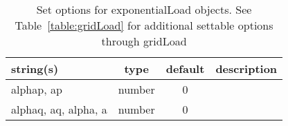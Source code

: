 \begin{table}[ht]
\centering
\begin{tabular}{p{5cm} c c p{7cm}}
\hline
string(s) & type & default & description \\
\hline
alphap, ap & number & 0 & \\
alphaq, aq, alpha, a & number & 0 & \\
\hline
\end{tabular}
\caption{Set options for exponentialLoad objects. See Table~\ref{table:gridLoad} for additional settable options through gridLoad}
\label{table:exponentialLoad}
\end{table}

